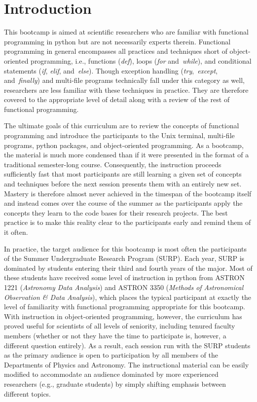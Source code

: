 
\section{Introduction}
\label{sec:intro}
\noindent
This bootcamp is aimed at scientific researchers who are familiar with
functional programming in python but are not necessarily experts therein.
Functional programming in general encompasses all practices and techniques
short of object-oriented programming, i.e., functions (\textit{def}), loops
(\textit{for} and~\textit{while}), and conditional statements (\textit{if},
\textit{elif}, and~\textit{else}).
Though exception handling (\textit{try},~\textit{except}, and~\textit{finally})
and multi-file programs technically fall under this category as well,
researchers are less familiar with these techniques in practice.
They are therefore covered to the appropriate level of detail along with a
review of the rest of functional programming.
\par
The ultimate goals of this curriculum are to review the concepts of functional
programming and introduce the participants to the Unix terminal, multi-file
programs, python packages, and object-oriented programming.
As a bootcamp, the material is much more condensed than if it were presented in
the format of a traditional semester-long course.
Consequently, the instruction proceeds sufficiently fast that most participants
are still learning a given set of concepts and techniques before the next
session presents them with an entirely new set.
Mastery is therefore almost never achieved in the timespan of the bootcamp
itself and instead comes over the course of the summer as the participants apply
the concepts they learn to the code bases for their research projects.
The best practice is to make this reality clear to the participants early and
remind them of it often.
\par
In practice, the target audience for this bootcamp is most often the
participants of the Summer Undergraduate Research Program (SURP).
Each year, SURP is dominated by students entering their third and fourth years
of the major.
Most of these students have received some level of instruction in python from
ASTRON 1221 (\textit{Astronomy Data Analysis}) and ASTRON 3350 (\textit{Methods
of Astronomical Observation \& Data Analysis}), which places the typical
participant at exactly the level of familiarity with functional programming
appropriate for this bootcamp.
With instruction in object-oriented programming, however, the curriculum has
proved useful for scientists of all levels of seniority, including tenured
faculty members (whether or not they have the time to participate is, however,
a different question entirely).
As a result, each session run with the SURP students as the primary audience is
open to participation by all members of the Departments of Physics and
Astronomy.
The instructional material can be easily modified to accommodate an audience
dominated by more experienced researchers (e.g., graduate students) by simply
shifting emphasis between different topics.

